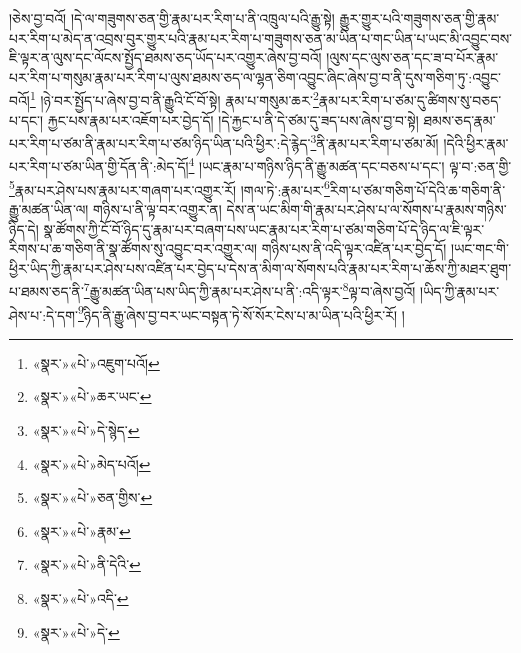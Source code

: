 །ཅེས་བྱ་བའོ། །དེ་ལ་གཟུགས་ཅན་གྱི་རྣམ་པར་རིག་པ་ནི་འཁྲུལ་པའི་རྒྱུ་སྟེ། རྒྱུར་གྱུར་པའི་གཟུགས་ཅན་གྱི་རྣམ་པར་རིག་པ་མེད་ན་འབྲས་བུར་གྱུར་པའི་རྣམ་པར་རིག་པ་གཟུགས་ཅན་མ་ཡིན་པ་གང་ཡིན་པ་ཡང་མི་འབྱུང་བས་ཇི་ལྟར་ན་ལུས་དང་ལོངས་སྤྱོད་ཐམས་ཅད་ཡོད་པར་འགྱུར་ཞེས་བྱ་བའོ། །ལུས་དང་ལུས་ཅན་དང་ཟ་བ་པོར་རྣམ་པར་རིག་པ་གསུམ་རྣམ་པར་རིག་པ་ལུས་ཐམས་ཅད་ལ་ལྷན་ཅིག་འབྱུང་ཞིང་ཞེས་བྱ་བ་ནི་དུས་གཅིག་ཏུ་:འབྱུང་བའོ།\footnote{«སྣར་»«པེ་»འཇུག་པའོ།} །ཉེ་བར་སྤྱོད་པ་ཞེས་བྱ་བ་ནི་རྒྱུའི་ངོ་བོ་སྟེ། རྣམ་པ་གསུམ་ཆར་\footnote{«སྣར་»«པེ་»ཆར་ཡང་}རྣམ་པར་རིག་པ་ཙམ་དུ་ཚིགས་སུ་བཅད་པ་དང་། རྐྱང་པས་རྣམ་པར་འཇོག་པར་བྱེད་དོ། །དེ་རྐྱང་པ་ནི་དེ་ཙམ་དུ་ཟད་པས་ཞེས་བྱ་བ་སྟེ། ཐམས་ཅད་རྣམ་པར་རིག་པ་ཙམ་ནི་རྣམ་པར་རིག་པ་ཙམ་ཉིད་ཡིན་པའི་ཕྱིར་:དེ་རྙེད་\footnote{«སྣར་»«པེ་»དེ་སྙེད་}ནི་རྣམ་པར་རིག་པ་ཙམ་མོ། །དེའི་ཕྱིར་རྣམ་པར་རིག་པ་ཙམ་ཡིན་གྱི་དོན་ནི་:མེད་དོ།\footnote{«སྣར་»«པེ་»མེད་པའོ།} །ཡང་རྣམ་པ་གཉིས་ཉིད་ནི་རྒྱུ་མཚན་དང་བཅས་པ་དང་། ལྟ་བ་:ཅན་གྱི་\footnote{«སྣར་»«པེ་»ཅན་གྱིས་}རྣམ་པར་ཤེས་པས་རྣམ་པར་གཞག་པར་འགྱུར་རོ། །གལ་ཏེ་:རྣམ་པར་\footnote{«སྣར་»«པེ་»རྣམ་}རིག་པ་ཙམ་གཅིག་པོ་དེའི་ཆ་གཅིག་ནི་རྒྱུ་མཚན་ཡིན་ལ། གཉིས་པ་ནི་ལྟ་བར་འགྱུར་ན། དེས་ན་ཡང་མིག་གི་རྣམ་པར་ཤེས་པ་ལ་སོགས་པ་རྣམས་གཉིས་ཉིད་དེ། སྣ་ཚོགས་ཀྱི་ངོ་བོ་ཉིད་དུ་རྣམ་པར་བཞག་པས་ཡང་རྣམ་པར་རིག་པ་ཙམ་གཅིག་པོ་དེ་ཉིད་ལ་ཇི་ལྟར་རིགས་པ་ཆ་གཅིག་ནི་སྣ་ཚོགས་སུ་འབྱུང་བར་འགྱུར་ལ། གཉིས་པས་ནི་འདི་ལྟར་འཛིན་པར་བྱེད་དོ། །ཡང་གང་གི་ཕྱིར་ཡིད་ཀྱི་རྣམ་པར་ཤེས་པས་འཛིན་པར་བྱེད་པ་དེས་ན་མིག་ལ་སོགས་པའི་རྣམ་པར་རིག་པ་ཆོས་ཀྱི་མཐར་ཐུག་པ་ཐམས་ཅད་ནི་\footnote{«སྣར་»«པེ་»ནི་དེའི་}རྒྱུ་མཚན་ཡིན་པས་ཡིད་ཀྱི་རྣམ་པར་ཤེས་པ་ནི་:འདི་ལྟར་\footnote{«སྣར་»«པེ་»འདི་}ལྟ་བ་ཞེས་བྱའོ། །ཡིད་ཀྱི་རྣམ་པར་ཤེས་པ་:དེ་དག་\footnote{«སྣར་»«པེ་»དེ་}ཉིད་ནི་རྒྱུ་ཞེས་བྱ་བར་ཡང་བསྟན་ཏེ་སོ་སོར་ངེས་པ་མ་ཡིན་པའི་ཕྱིར་རོ། །

